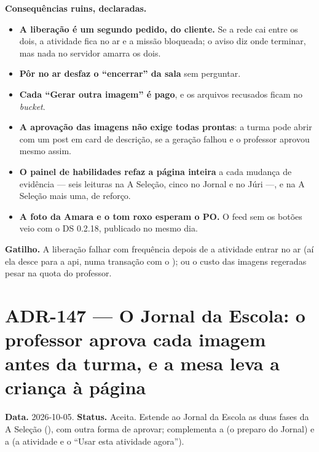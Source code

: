 \textbf{Consequências ruins, declaradas.}

\begin{itemize}
  \item \textbf{A liberação é um segundo pedido, do cliente.} Se a rede cai
    entre os dois, a atividade fica no ar e a missão bloqueada; o aviso diz
    onde terminar, mas nada no servidor amarra os dois.
  \item \textbf{Pôr no ar desfaz o \enquote{encerrar} da sala} sem perguntar.
  \item \textbf{Cada \enquote{Gerar outra imagem} é pago}, e os arquivos
    recusados ficam no \emph{bucket}.
  \item \textbf{A aprovação das imagens não exige todas prontas}: a turma pode
    abrir com um post em card de descrição, se a geração falhou e o professor
    aprovou mesmo assim.
  \item \textbf{O painel de habilidades refaz a página inteira} a cada
    mudança de evidência --- seis leituras na A Seleção, cinco no Jornal e no
    Júri ---, e na A Seleção mais uma, de reforço.
  \item \textbf{A foto da Amara e o tom roxo esperam o PO.} O feed sem os
    botões veio com o DS 0.2.18, publicado no mesmo dia.
\end{itemize}

\textbf{Gatilho.} A liberação falhar com frequência depois de a atividade
entrar no ar (aí ela desce para a api, numa transação com o
); ou o custo das imagens regeradas pesar na quota do
professor.

\section{ADR-147 --- O Jornal da Escola: o professor aprova cada imagem antes da turma, e a mesa leva a criança à página}
\label{adr:jornal-aprova-cada-imagem}

\textbf{Data.} 2026-10-05. \textbf{Status.} Aceita. Estende ao Jornal da Escola
as duas fases da A Seleção (), com outra forma de aprovar;
complementa a  (o preparo do Jornal) e a  (a
atividade e o \enquote{Usar esta atividade agora}).

